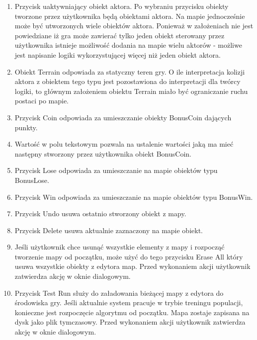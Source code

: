 \begin{par}
\begin{par}
\begin{enumerate}
		\item Przycisk uaktywniający obiekt aktora. Po wybraniu przycisku obiekty tworzone przez użytkownika będą obiektami aktora. Na mapie jednocześnie może być utworzonych wiele obiektów aktora. Ponieważ w założeniach nie jest powiedziane iż gra może zawierać tylko jeden obiekt sterowany przez użytkownika istnieje możliwość dodania na mapie wielu aktorów - możliwe jest napisanie logiki wykorzystującej więcej niż jeden obiekt aktora.
		\item Obiekt Terrain odpowiada za statyczny teren gry. O ile interpretacja kolizji aktora z obiektem tego typu jest pozostawiona do interpretacji dla twórcy logiki, to głównym założeniem obiektu Terrain miało być ograniczanie ruchu postaci po mapie.
		\item Przycisk Coin odpowiada za umieszczanie obiekty BonusCoin dających punkty.
		\item Wartość w polu tekstowym pozwala na ustalenie wartości jaką ma mieć następny stworzony przez użytkownika obiekt BonusCoin.
		\item Przycisk Lose odpowiada za umieszczanie na mapie obiektów typu BonusLose.
		\item Przycisk Win odpowiada za umieszczanie na mapie obiektów typu BonusWin.
		\item Przycisk Undo usuwa ostatnio stworzony obiekt z mapy.
		\item Przycisk Delete usuwa aktualnie zaznaczony na mapie obiekt.
		\item Jeśli użytkownik chce usunąć wszystkie elementy z mapy i rozpocząć tworzenie mapy od początku, może użyć do tego przycisku Erase All który usuwa wszystkie obiekty z edytora map. Przed wykonaniem akcji użytkownik zatwierdza akcję w oknie dialogowym.
		\item Przycisk Test Run służy do załadowania bieżącej mapy z edytora do środowiska gry. Jeśli aktualnie system pracuje w trybie treningu populacji, konieczne jest rozpoczęcie algorytmu od początku. Mapa zostaje zapisana na dysk jako plik tymczasowy. Przed wykonaniem akcji użytkownik zatwierdza akcję w oknie dialogowym.
		
	\end{enumerate}
\end{par}
	
\end{par}

